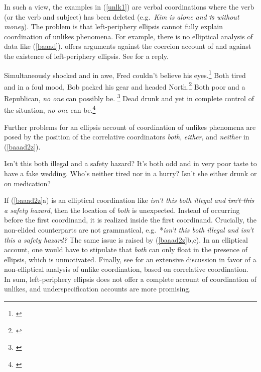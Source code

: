 \noindent
In such a view, the examples in (\ref{unlk1})  are verbal coordinations where the verb (or the verb and subject) has been deleted  (e.g.\ \emph{Kim is alone and \sout{is} without money}).  The problem is that  left-periphery ellipsis  cannot  fully explain 
coordination of unlikes phenomena. For example, there is no elliptical analysis of  data like (\ref{baaad}). \citet{levine11} offers  arguments against
the coercion account of \citet{chaves06}
and against  the existence of left-periphery ellipsis. See \cite{yatabe12} for a reply.

\eal
\label{baaad}
\ex Simultaneously shocked and in awe, Fred couldn't believe his eyes.\footnote{\citep[]{Chaves2013b-u}}
\ex  Both tired and in a foul mood, Bob packed his gear and headed North.\footnote{\citep[]{chaves06}}
\ex Both poor and a Republican, \emph{no one} can possibly be. \footnote{\citep[]{Chaves2013b-u}}
\ex  Dead drunk and yet in complete control of the situation, \emph{no one} can be.\footnote{\citep[]{levine11}}
\zl



\noindent
Further problems for an  ellipsis account of coordination
of unlikes phenomena are posed by the position of  the 
correlative coordinators \emph{both}, \emph{either}, and
 \emph{neither} in (\ref{baaad2z}).

\eal
\label{baaad2z}
\ex Isn't this both illegal and a safety hazard?
\ex It's both odd and in very poor taste to have a fake wedding.
\ex Who's neither tired nor in a hurry?
\ex Isn't she either drunk or on medication?
\zl



\noindent
 If (\ref{baaad2z}a) is an elliptical coordination
like \emph{isn't this both illegal and \sout{isn't this} a safety
hazard}, then the location of \emph{both} is unexpected. Instead of
occurring before the first coordinand, it is realized inside the first
coordinand. Crucially, the non-elided counterparts are not
grammatical, e.g.\ *\emph{isn't this both illegal and isn't this a
safety hazard?} The same issue is raised by (\ref{baaad2z}b,c). In
an elliptical account, one would have to stipulate
that \emph{both} can only float in the presence of ellipsis, which
is unmotivated.
Finally, see \citet{Mouret:07} for  an extensive discussion in favor of a non-elliptical analysis of unlike coordination, based on correlative coordination.
In sum, left-periphery ellipsis does not 
offer a complete account of coordination of unlikes, and underspecification
accounts are more promising.




